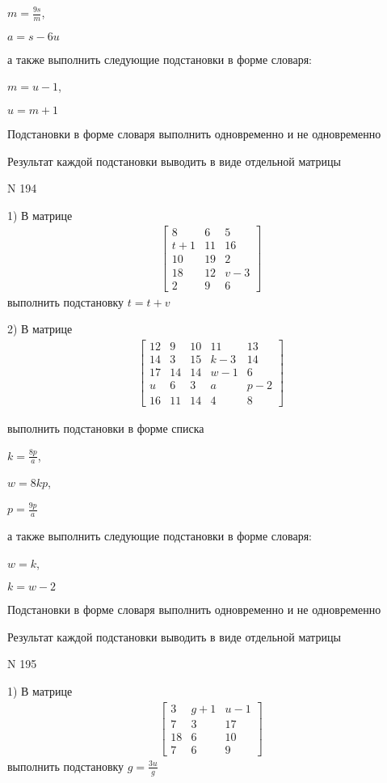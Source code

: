 \documentclass[11pt]{report}
\begin{document}
$m=\frac{9 s}{m}$,

$a=s - 6 u$

а также выполнить следующие подстановки в форме словаря:

$m=u - 1$,

$u=m + 1$


    Подстановки в форме словаря выполнить одновременно и не одновременно


    Результат каждой подстановки выводить в виде отдельной матрицы

\newpage
N 194


    1) В матрице
\begin{align*}
\left[\begin{matrix}8 & 6 & 5\\t + 1 & 11 & 16\\10 & 19 & 2\\18 & 12 & v - 3\\2 & 9 & 6\end{matrix}\right]
\end{align*}
выполнить подстановку $t=t + v$


    2) В матрице
\begin{align*}
\left[\begin{matrix}12 & 9 & 10 & 11 & 13\\14 & 3 & 15 & k - 3 & 14\\17 & 14 & 14 & w - 1 & 6\\u & 6 & 3 & a & p - 2\\16 & 11 & 14 & 4 & 8\end{matrix}\right]
\end{align*}

выполнить подстановки в форме списка

$k=\frac{8 p}{a}$,

$w=8 k p$,

$p=\frac{9 p}{a}$

а также выполнить следующие подстановки в форме словаря:

$w=k$,

$k=w - 2$


    Подстановки в форме словаря выполнить одновременно и не одновременно


    Результат каждой подстановки выводить в виде отдельной матрицы

\newpage
N 195


    1) В матрице
\begin{align*}
\left[\begin{matrix}3 & g + 1 & u - 1\\7 & 3 & 17\\18 & 6 & 10\\7 & 6 & 9\end{matrix}\right]
\end{align*}
выполнить подстановку $g=\frac{3 u}{g}$
\end{document}
